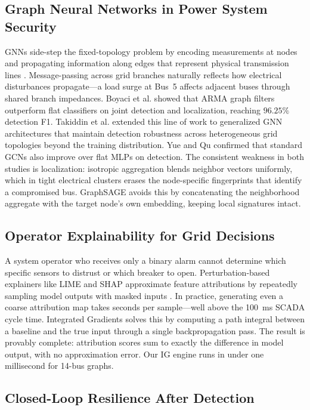 \documentclass[conference]{IEEEtran}
\begin{document}
\subsection{Graph Neural Networks in Power System Security}

GNNs side-step the fixed-topology problem by encoding measurements at nodes and propagating information along edges that represent physical transmission lines \cite{b2}. Message-passing across grid branches naturally reflects how electrical disturbances propagate---a load surge at Bus~5 affects adjacent buses through shared branch impedances. Boyaci et al. \cite{b10} showed that ARMA graph filters outperform flat classifiers on joint detection and localization, reaching $96.25\%$ detection F1. Takiddin et al. \cite{b11} extended this line of work to generalized GNN architectures that maintain detection robustness across heterogeneous grid topologies beyond the training distribution. Yue and Qu \cite{b14} confirmed that standard GCNs also improve over flat MLPs on detection. The consistent weakness in both studies is localization: isotropic aggregation blends neighbor vectors uniformly, which in tight electrical clusters erases the node-specific fingerprints that identify a compromised bus. GraphSAGE \cite{b8} avoids this by concatenating the neighborhood aggregate with the target node's own embedding, keeping local signatures intact.

\subsection{Operator Explainability for Grid Decisions}

A system operator who receives only a binary alarm cannot determine which specific sensors to distrust or which breaker to open. Perturbation-based explainers like LIME and SHAP approximate feature attributions by repeatedly sampling model outputs with masked inputs \cite{b15}. In practice, generating even a coarse attribution map takes seconds per sample---well above the 100~ms SCADA cycle time. Integrated Gradients \cite{b7} solves this by computing a path integral between a baseline and the true input through a single backpropagation pass. The result is provably complete: attribution scores sum to exactly the difference in model output, with no approximation error. Our IG engine runs in under one millisecond for 14-bus graphs.

\subsection{Closed-Loop Resilience After Detection}
\end{document}
